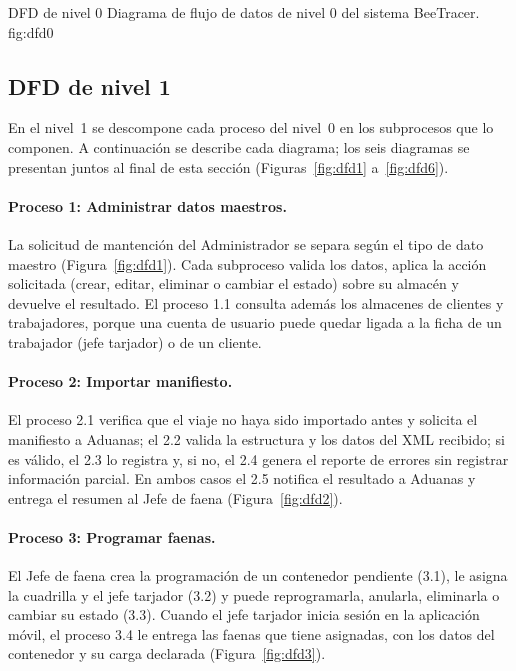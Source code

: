     {DFD de nivel 0}
    {Diagrama de flujo de datos de nivel 0 del sistema BeeTracer.}
    {fig:dfd0}

\subsection{DFD de nivel 1}
\label{sec:dfd1}

En el nivel~1 se descompone cada proceso del nivel~0 en los subprocesos que lo componen. A continuación se describe cada diagrama; los seis diagramas se presentan juntos al final de esta sección (Figuras~\ref{fig:dfd1} a~\ref{fig:dfd6}).

\paragraph{Proceso 1: Administrar datos maestros.} La solicitud de mantención del
Administrador se separa según el tipo de dato maestro (Figura~\ref{fig:dfd1}). Cada
subproceso valida los datos, aplica la acción solicitada (crear, editar, eliminar o cambiar
el estado) sobre su almacén y devuelve el resultado. El proceso 1.1 consulta además los
almacenes de clientes y trabajadores, porque una cuenta de usuario puede quedar ligada a la
ficha de un trabajador (jefe tarjador) o de un cliente.

\paragraph{Proceso 2: Importar manifiesto.} El proceso 2.1 verifica que el viaje no haya sido
importado antes y solicita el manifiesto a Aduanas; el 2.2 valida la estructura y los datos
del XML recibido; si es válido, el 2.3 lo registra y, si no, el 2.4 genera el reporte de
errores sin registrar información parcial. En ambos casos el 2.5 notifica el resultado a
Aduanas y entrega el resumen al Jefe de faena (Figura~\ref{fig:dfd2}).

\paragraph{Proceso 3: Programar faenas.} El Jefe de faena crea la programación de un
contenedor pendiente (3.1), le asigna la cuadrilla y el jefe tarjador (3.2) y puede
reprogramarla, anularla, eliminarla o cambiar su estado (3.3). Cuando el jefe tarjador inicia
sesión en la aplicación móvil, el proceso 3.4 le entrega las faenas que tiene asignadas, con
los datos del contenedor y su carga declarada (Figura~\ref{fig:dfd3}).

